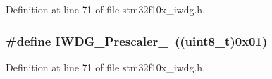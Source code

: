 Definition at line 71 of file stm32f10x\+\_\+iwdg.\+h.

\subsubsection[{\texorpdfstring{I\+W\+D\+G\+\_\+\+Prescaler\+\_\+8}{IWDG_Prescaler_8}}]{\setlength{\rightskip}{0pt plus 5cm}\#define I\+W\+D\+G\+\_\+\+Prescaler\+\_~(({\bf uint8\+\_\+t})0x01)}\hypertarget{group___i_w_d_g__prescaler_ga59763b9a127c67adf5d11474188996a1}{}\label{group___i_w_d_g__prescaler_ga59763b9a127c67adf5d11474188996a1}


Definition at line 71 of file stm32f10x\+\_\+iwdg.\+h.

